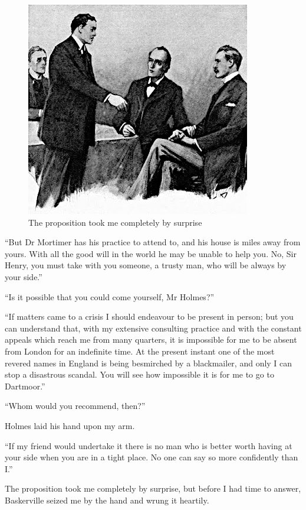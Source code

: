\documentclass[paper=5.5in:8.5in,BCOR=7mm,twoside,DIV=calc,12pt,usegeometry,openany,chapterprefix,endperiod,headings=big]{scrbook} %
\begin{document}
\begin{figure}[t!h]
\centering
\includegraphics[width=.8\linewidth]{05_proposition}
\caption{The proposition took me completely by surprise}
\end{figure}

\enquote{But Dr Mortimer has his practice to attend to, and his house is miles away from yours. With all the good will in the world he may be unable to help you. No, Sir Henry, you must take with you someone, a trusty man, who will be always by your side.}

\enquote{Is it possible that you could come yourself, Mr Holmes?}

\enquote{If matters came to a crisis I should endeavour to be present in person; but you can understand that, with my extensive consulting practice and with the constant appeals which reach me from many quarters, it is impossible for me to be absent from London for an indefinite time. At the present instant one of the most revered names in England is being besmirched by a blackmailer, and only I can stop a disastrous scandal. You will see how impossible it is for me to go to Dartmoor.}

\enquote{Whom would you recommend, then?}

Holmes laid his hand upon my arm.

\enquote{If my friend would undertake it there is no man who is better worth having at your side when you are in a tight place. No one can say so more confidently than I.}

The proposition took me completely by surprise, but before I had time to answer, Baskerville seized me by the hand and wrung it heartily.
\end{document}
